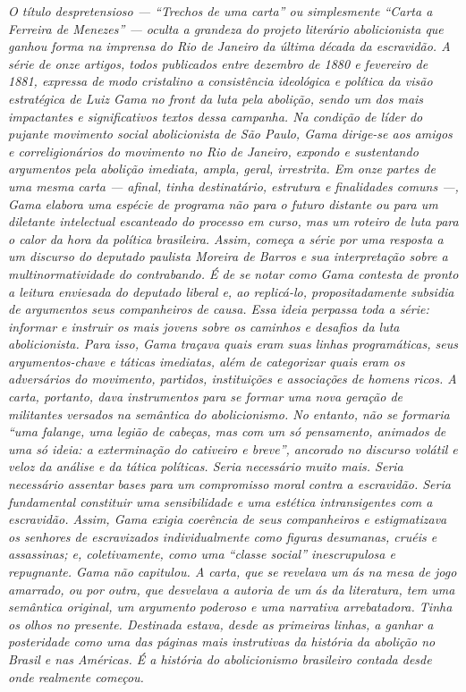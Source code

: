\begin{didas}
\emph{O título despretensioso --- ``Trechos de uma carta'' ou
simplesmente ``Carta a Ferreira de Menezes'' --- oculta a grandeza
do projeto literário abolicionista que ganhou forma na imprensa do Rio
de Janeiro da última década da escravidão. A série de onze artigos,
todos publicados entre dezembro de 1880 e fevereiro de 1881, expressa de
modo cristalino a consistência ideológica e política da visão
estratégica de Luiz Gama no front da luta pela abolição, sendo
um dos mais impactantes e significativos textos dessa campanha.
Na condição de líder do pujante movimento social
abolicionista de São Paulo, Gama dirige-se aos amigos e correligionários
do movimento no Rio de Janeiro, expondo e sustentando argumentos pela
abolição imediata, ampla, geral, irrestrita. Em onze partes de uma mesma
carta --- afinal, tinha destinatário, estrutura e finalidades comuns ---,
Gama elabora uma espécie de programa não para o futuro distante ou para
um diletante intelectual escanteado do processo em curso, mas um
roteiro de luta para o calor da hora da política brasileira. Assim,
começa a série por uma resposta a um discurso do deputado paulista
Moreira de Barros e sua interpretação sobre a multinormatividade do
contrabando. É de se notar como Gama contesta de pronto a leitura
enviesada do deputado liberal e, ao
replicá-lo, propositadamente subsidia de argumentos seus companheiros de
causa. Essa ideia perpassa toda a série:
informar e instruir os mais jovens sobre os caminhos e
desafios da luta abolicionista. Para isso, Gama traçava quais eram suas
linhas programáticas, seus argumentos-chave e táticas imediatas, além de
categorizar quais eram os adversários do movimento, partidos,
instituições e associações de homens ricos. A carta, portanto, dava
instrumentos para se formar uma nova geração de militantes versados na
semântica do abolicionismo. No entanto, não se formaria ``uma falange,
uma legião de cabeças, mas com um só pensamento, animados de uma só
ideia: a exterminação do cativeiro e breve'', ancorado no discurso
volátil e veloz da análise e da tática políticas. Seria necessário muito
mais. Seria necessário assentar bases para um compromisso moral contra a
escravidão. Seria fundamental constituir uma sensibilidade e uma
estética intransigentes com a escravidão. Assim, Gama exigia coerência
de seus companheiros e
estigmatizava os senhores de escravizados individualmente como figuras
desumanas, cruéis e assassinas; e, coletivamente, como uma ``classe
social'' inescrupulosa e repugnante. Gama não capitulou. A carta, que se
revelava um ás na mesa de jogo amarrado, ou por outra, que desvelava a
autoria de um ás da literatura, tem uma semântica original, um argumento
poderoso e uma narrativa arrebatadora. Tinha os olhos no presente.
Destinada estava, desde as primeiras linhas, a ganhar a posteridade como
uma das páginas mais instrutivas da história da abolição no Brasil e nas
Américas. É a história do abolicionismo brasileiro contada desde onde
realmente começou. }
\end{didas}

